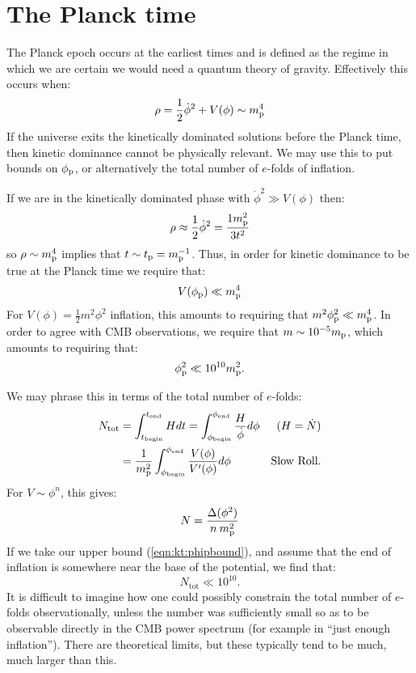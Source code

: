 \section{The Planck time}
The Planck epoch occurs at the earliest times and is defined as the
regime in which we are certain we would need a quantum theory of
gravity. Effectively this occurs when:
\begin{equation}
  \rho = \frac{1}{2}\dot\phi^2 + V(\phi)  \sim m_{\mathrm{p}}^4
  \label{eqn:kt:rhosim}
\end{equation}
If the universe exits the kinetically dominated solutions before the
Planck time, then kinetic dominance cannot be physically relevant. We
may use this to put bounds on \(\phi_{\mathrm{p}}\), or alternatively the total
number of \(e\)-folds of inflation.

If we are in the kinetically dominated phase with \(\dot{\phi}^2\gg
V(\phi)\) then:
\begin{equation}
              \rho \approx \frac{1}{2}\dot\phi^2= \frac{1m_{\mathrm{p}}^2}{3t^2} 
  \label{eqn:kt:rhop}
\end{equation}
so \(\rho\sim m_{\mathrm{p}}^4\) implies that \(t\sim t_{\mathrm{p}}=m_{\mathrm{p}}^{-1}\). Thus, in order for
kinetic dominance to be true at the Planck time we require that:
\begin{equation}
  V(\phi_{\mathrm{p}}) \ll m_{\mathrm{p}}^4
\end{equation}
For \(V(\phi) = \frac{1}{2}m^2\phi^2\) inflation, this amounts to requiring that \(m^2\phi_{\mathrm{p}}^2\ll m_{\mathrm{p}}^4\). In order to agree with CMB observations, we require
that \(m\sim10^{-5}m_{\mathrm{p}}\), which amounts to requiring that:
\begin{equation}
 \phi_{\mathrm{p}}^2 \ll 10^{10}m_{\mathrm{p}}^2 \nonumber.
 \label{eqn:kt:phipbound}
\end{equation}

We may phrase this in terms of the total number of \(e\)-folds:
\begin{align}
  N_\mathrm{tot} 
  &=\int_{t_\mathrm{begin}}^{t_\mathrm{end}} H dt 
  =\int_{\phi_\mathrm{begin}}^{\phi_\mathrm{end}} 
       \frac{H}{\dot{\phi}}d\phi  &\text{(\(H=\dot{N}\))}
  \\
  &=\frac{1}{m_{\mathrm{p}}^2}\int_{\phi_\mathrm{begin}}^{\phi_\mathrm{end}}
     {\frac{V(\phi)}{V^\prime(\phi)}}d\phi &\text{Slow Roll.}
\end{align}
For \(V\sim\phi^n\), this gives:
\begin{equation}
  N = \frac{\Delta (\phi^2) }{n\:m_{\mathrm{p}}^2}
\end{equation}
If we take our upper bound (\ref{eqn:kt:phipbound}), and assume that the
end of inflation is somewhere near the base of the potential, we find
that: 
\begin{equation}
  N_\mathrm{tot}\ll 10^{10}.
\end{equation}
It is difficult to imagine how one could possibly constrain the total
number of \(e\)-folds observationally, unless the number was
sufficiently small so as to be observable directly in the CMB power
spectrum (for example in ``just enough inflation''). There are
theoretical limits, but these typically tend to be much, much larger
than this.

